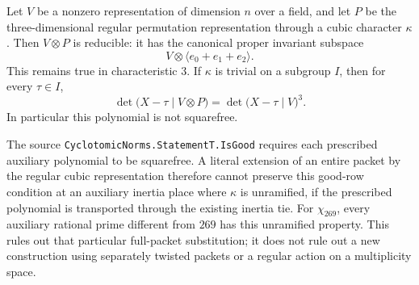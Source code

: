 \begin{proposition}
\label{AC-G29-good-row}
Let $V$ be a nonzero representation of dimension $n$ over a
field, and let $P$ be the three-dimensional regular permutation
representation through a cubic character $\kappa$.
Then $V\otimes P$ is reducible: it has the canonical proper
invariant subspace
\[
             V\otimes\langle e_0+e_1+e_2\rangle.
                                                        \tag{G29.9}
\]
This remains true in characteristic $3$.
If $\kappa$ is trivial on a subgroup $I$, then for every
$\tau\in I$,
\[
 \det\bigl(X-\tau\mid V\otimes P\bigr)
                  =\det\bigl(X-\tau\mid V\bigr)^3.     \tag{G29.10}
\]
In particular this polynomial is not squarefree.

The source \texttt{CyclotomicNorms.StatementT.IsGood}
requires each prescribed auxiliary polynomial to be
squarefree.  A literal extension of an entire packet by
the regular cubic representation therefore cannot preserve
this good-row condition at an auxiliary inertia place
where $\kappa$ is unramified, if the prescribed polynomial
is transported through the existing inertia tie.
For $\chi_{269}$, every auxiliary rational prime different
from $269$ has this unramified property.
This rules out that particular full-packet substitution;
it does not rule out a new construction using separately
twisted packets or a regular action on a multiplicity space.
\end{proposition}

